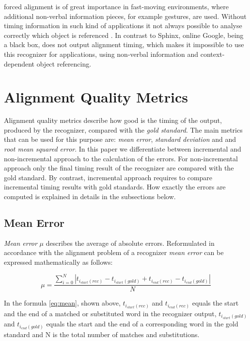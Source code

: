forced alignment is of great importance in fast-moving environments, where
additional non-verbal information pieces, for example gestures, are used. 
Without timing information in such kind of applications it not always possible to
analyse correctly which object is referenced 
\parencite {Baumann2016}.  In contrast to Sphinx, online Google, being a black
box, does not output alignment timing, which makes it impossible to use this 
recognizer for applications, using non-verbal information and context-dependent
object referencing. 

\section {Alignment Quality Metrics}
Alignment quality metrics describe how good is the timing of the output,
produced by the recognizer, compared with the \textit {gold standard}. The main
metrics that can be used for this purpose are: \textit {mean error}, \textit {standard deviation} and 
and \textit {root mean squared error}. In this paper we
differentiate between incremental and non-incremental approach to the
calculation of the errors.  For non-incremental approach only the
final timing result of the recognizer are compared with the gold standard. By
contrast, incremental approach requires to compare incremental timing results with gold
standards.  How exactly the errors are computed is explained in details in
the subsections below. 
\subsection {Mean Error} \textit {Mean error}  $\mu$ 
describes the average of absolute errors. Reformulated in accordance with
the alignment problem of a recognizer  \textit {mean error}   can be expressed
mathematically as follows:
\begin{center} 
\begin{equation} \mu=\frac{\sum_{i=0}^N
|t_{i_{start}(rec)}-t_{i_{start}(gold)}+t_{i_{end}(rec)}-t_{i_{end}(gold)}|}{N}
\label{eq:mean}
\end{equation}
\end{center} In the formula  \ref {eq:mean}, shown above, 
$t_{i_{start}(rec)}$ and $t_{i_{end}(rec)}$ equals the start and the end of a
matched or substituted word in the recognizer output,
$t_{i_{start}(gold)}$ and $t_{i_{end}(gold)}$ equals the start and the end of
a corresponding word in the gold standard and N is the total number of matches
and substitutions.

